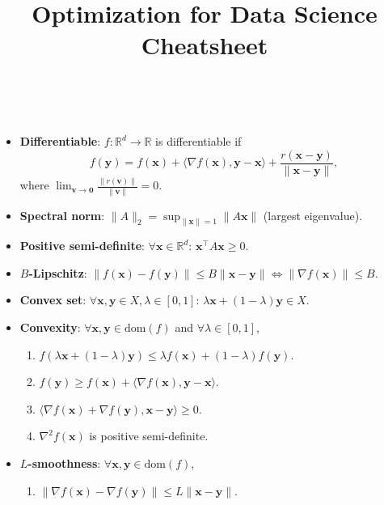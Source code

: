 \documentclass[a4paper]{article}
\title{Optimization for Data Science Cheatsheet}
\newcommand{\R}{\mathbb{R}}
\renewcommand{\vec}[1]{\mathbf{#1}}
\newcommand{\mat}[1]{#1}
\newcommand{\dom}[1]{\mathrm{dom}(#1)}
\newenvironment{topic}[1]
{\textbf{\sffamily \colorbox{black}{\rlap{\textbf{\textcolor{white}{#1}}}\hspace{\linewidth}\hspace{-2\fboxsep}}} \\ \vspace{0.2cm}}
{}
\begin{document}
\setlength{\columnsep}{0.2cm}

\begin{multicols*}{2}
    \begin{topic}{Definitions}
        \begin{itemize}
            \item \textbf{Differentiable}: $f: \R^d \to \R$ is differentiable if \[
                      f(\vec{y}) = f(\vec{x}) + \langle \nabla f(\vec{x}), \vec{y} - \vec{x} \rangle + \frac{r(\vec{x} - \vec{y})}{\| \vec{x} - \vec{y} \|},
                  \]
                  where $\lim_{\vec{v} \to \vec{0}} \frac{\| r(\vec{v}) \|}{\| \vec{v} \|} = 0$.

            \item \textbf{Spectral norm}: $\| \mat{A} \|_2 = \sup_{\| \vec{x} \| = 1} \| \mat{A} \vec{x} \|$ (largest eigenvalue).
            \item \textbf{Positive semi-definite}: $\forall \vec{x} \in \R^d$: $\vec{x}^\top \mat{A} \vec{x} \geq 0$.
            \item \textbf{$B$-Lipschitz}: $\| f(\vec{x}) - f(\vec{y}) \| \leq B \| \vec{x} - \vec{y} \| \Leftrightarrow \| \nabla f(\vec{x}) \| \leq B$.
            \item \textbf{Convex set}: $\forall \vec{x}, \vec{y} \in X, \lambda \in [0,1]$: $\lambda \vec{x} + (1-\lambda) \vec{y} \in X$.
            \item \textbf{Convexity}: $\forall \vec{x}, \vec{y} \in \dom{f}$ and $\forall \lambda \in [0,1]$,
                  \begin{enumerate}
                      \item $f(\lambda \vec{x} + (1-\lambda)\vec{y}) \leq \lambda f(\vec{x}) + (1-\lambda) f(\vec{y})$.
                      \item $f(\vec{y}) \geq f(\vec{x}) + \langle \nabla f(\vec{x}), \vec{y} - \vec{x} \rangle$.
                      \item $\langle \nabla f(\vec{x}) + \nabla f(\vec{y}), \vec{x} - \vec{y} \rangle \geq 0$.
                      \item $\nabla^2 f(\vec{x})$ is positive semi-definite.
                  \end{enumerate}
            \item \textbf{$L$-smoothness}: $\forall \vec{x}, \vec{y} \in \dom{f}$,
                  \begin{enumerate}
                      \item $\| \nabla f(\vec{x}) - \nabla f(\vec{y}) \| \leq L \| \vec{x} - \vec{y} \|$.

\end{enumerate}
\end{itemize}
\end{topic}
\end{multicols*}
\end{document}
